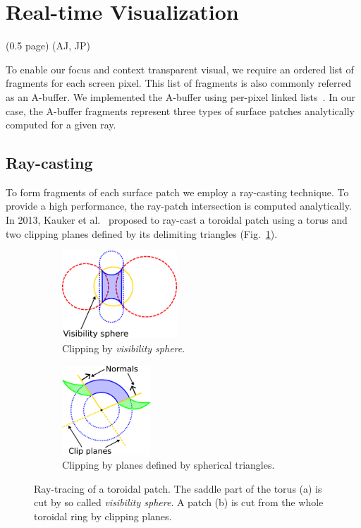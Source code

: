 \section{Real-time Visualization} (0.5 page) (AJ, JP)
\label{sec:vis}

To enable our focus and context transparent visual, we require an ordered list of fragments for each screen pixel. This list of fragments is also commonly referred as an A-buffer. We implemented the A-buffer using per-pixel linked lists~\cite{yang2010real}. In our case, the A-buffer fragments represent three types of surface patches analytically computed for a given ray.

\subsection{Ray-casting}
\label{sec:spherical-patches}
To form fragments of each surface patch we employ a ray-casting technique. To provide a high performance, the ray-patch intersection is computed analytically.
In 2013, Kauker et al.~\cite{kauker2013rendering} proposed to ray-cast a toroidal patch using a torus and two clipping planes defined by its delimiting triangles (Fig.~\ref{fig:torus-vs}).
\begin{figure}[htp]
  \centering
  \begin{subfigure}[t]{0.55\columnwidth}
    \centering
    \includegraphics[width=1.7in]{image/torus-vs.png}
    \caption{Clipping by \textit{visibility sphere}.}
		\label{fig:torus-vs}
  \end{subfigure}%
  \quad
  \begin{subfigure}[t]{0.4\columnwidth}
    \centering
    \includegraphics[width=1.3in]{image/torus-planes.png}
    \caption{Clipping by planes defined by spherical triangles.}
  \end{subfigure}
\caption{Ray-tracing of a toroidal patch. The saddle part of the torus (a) is cut by so called \textit{visibility sphere}.
A patch (b) is cut from the whole toroidal ring by clipping planes.}
\end{figure}

